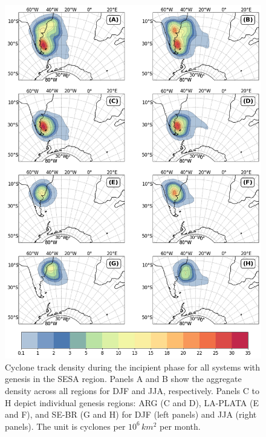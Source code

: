 \begin{figure}[!htbp]
\centering
\includegraphics[width=\textwidth]{figs_4/density_map_incipient.png}
\caption[Track Density - Incipient Phase]{Cyclone track density during the incipient phase for all systems with genesis in the SESA region. Panels A and B show the aggregate density across all regions for DJF and JJA, respectively. Panels C to H depict individual genesis regions: ARG (C and D), LA-PLATA (E and F), and SE-BR (G and H) for DJF (left panels) and JJA (right panels). The unit is cyclones per \(10^6 \, km^2\) per month.}
\label{fig:density_map_incipient}
\end{figure}

